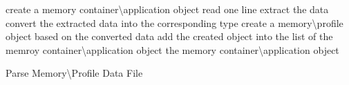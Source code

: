 \setlength{\textfloatsep}{0.2cm}
\begin{algorithm2e}[H]
		create a memory container\textbackslash application object\;
		{
			read one line\;
			{
				extract the data\;
				convert the extracted data into the corresponding type\;
				create a memory\textbackslash profile object based on the converted data\;
				add the created object into the list of the memroy container\textbackslash application object\;
			}
		}
		\Return the memory container\textbackslash application object\;
	\caption{Parse Memory\textbackslash Profile Data File}
	\label{algo:mem_profile_parser}
\end{algorithm2e}
\setlength{\textfloatsep}{0.2cm}
